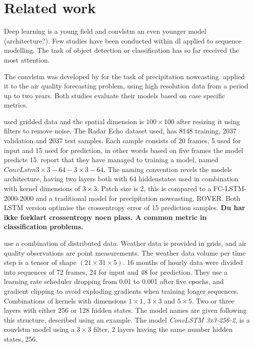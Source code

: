 \section{Related work} \label{sec:related_work}
Deep learning is a young field and \acrshort{convlstm} an even younger model (architecture?). Few studies have been conducted within \acrshort{dl} applied to sequence modelling. The task of object detection or classification has so far received the most attention.

The \acrshort{convlstm} was developed by  for the task of precipitation nowcasting.  applied it to the air quality forecasting problem, using high resolution data from a period up to two years. Both studies evaluate their models based on case specific metrics. %

 used gridded data and the spatial dimension is $100\times 100$ after resizing it using filters to remove noise. The Radar Echo dataset used, has 8148 training, 2037 validation and 2037 test samples. Each sample consists of 20 frames, 5 used for input and 15 used for prediction, in other words based on five frames the model predicts 15. \citeauthor{precip_nowcasting} report that they have managed to training a model, named $ConvLstm 3\times 3-64-3\times 3-64$. The naming convention revels the models architecture, having two layers both with 64 hiddenstates used in combination with kernel dimensions of  $3\times 3$. Patch size is 2, this is compared to a FC-LSTM-2000-2000 and a traditional model for precipitation nowcasting, ROVER. Both LSTM version optimise the crossentropy error of 15 prediction samples. \textbf{Du har ikke forklart crossentropy noen plass. A common metric in classification problems.}

 use a combination of distributed data. Weather data is provided in grids, and air quality observations are point measurements. The weather data volume per time step is a tensor of shape $(21 \times 31 \times 5)$. 16 months of hourly data were divided into sequences of 72 frames, 24 for input and 48 for prediction. %
They use a learning rate scheduler dropping from 0.01 to 0.001 after five epochs, and gradient clipping to avoid exploding gradients when training longer sequences. Combinations of kernels with dimensions $1\times 1$, $3\times 3$ and $5\times 5$. Two or three layers with either 256 or 128 hidden states. The model names are given following this structure, described using an example. The model \textit{ConvLSTM 3x3-256-2}, is a \acrshort{convlstm} model using a $3\times 3$ filter, 2 layers having the same number hidden states, 256.

